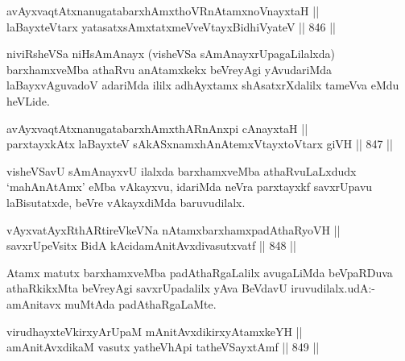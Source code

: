 
\begin{shl}
avAyxvaqtAtxnanugatabarxhAmxthoVR\s nAtamxnoV\s nayxtaH || \\
laBayxteV\s tarx yatasatxsAmxtatxmeVveVtayxBidhiVyateV \hfill || 846 ||  
\end{shl}

\begin{artha}
niviRsheVSa niHsAmAnayx (visheVSa sAmAnayxrUpagaLilalxda) barxhamxveMba athaRvu anAtamxkekx beVreyAgi yAvudariMda laBayxvAguvadoV adariMda ililx adhAyxtamx shAsatxrXdalilx tameVva eMdu heVLide.
\end{artha}


\begin{shl}
avAyxvaqtAtxnanugatabarxhAmxthARnAnxpi cAnayxtaH || \\
parxtayxkAtx laBayxteV sAkASxnamxhAnAtemxVtayxtoV\s tarx giVH \hfill || 847 ||  
\end{shl}

\begin{artha}
visheVSavU sAmAnayxvU ilalxda barxhamxveMba athaRvuLaLxdudx `mahAnAtAmx' eMba vAkayxvu, idariMda neVra parxtayxkf savxrUpavu laBisutatxde, beVre vAkayxdiMda baruvudilalx.
\end{artha}


\begin{shl}
vAyxvatAyxRthARtireVkeVNa nA\s \s tamxbarxhamxpadAthaRyoVH || \\
savxrUpeV\s sitx BidA kAcidamAnitAvxdivasutxvatf \hfill || 848 ||  
\end{shl}

\begin{artha}
Atamx matutx barxhamxveMba padAthaRgaLalilx avugaLiMda beVpaRDuva athaRkikxMta beVreyAgi savxrUpadalilx yAva BeVdavU iruvudilalx.udA:-amAnitavx muMtAda padAthaRgaLaMte.
\end{artha}


\begin{shl}
virudhayxteV\s kirxyArUpaM mAnitAvxdikirxyAtamxkeYH || \\
amAnitAvxdikaM vasutx yatheVhApi tatheVSayxtAmf \hfill || 849 ||  
\end{shl}

